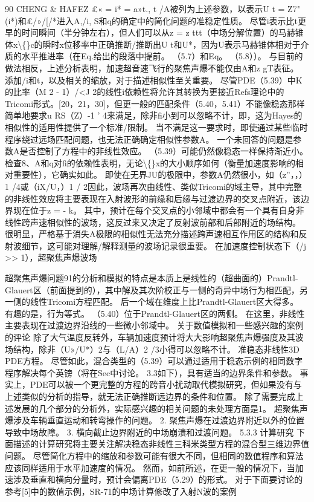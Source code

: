 \documentclass[UTF8,11pt,a4paper,openany,fontset=fandol]{ctexbook}
\begin{document}
90 CHENG \& HAFEZ £« = i* = a»t., t /A被列为上述参数，以表示U t = Z7"(i*)和£/»/[/*进入A,/i, S和q的确定中的简化问题的准稳定性质。 尽管i表示比t更早的时间瞬间（半分钟左右），但人们可以从z = z ttt（中场分解位置）的马赫锥体x\textbackslash\{\}c的瞬时x位移率中正确推断/推断出U t和U*，因为U表示马赫锥体相对于介质的水平推进率（在Eq.给出的段落中提前。 （5.7）和Eq。 （5.8））。 与目前的做法相反，上述分析表明，加速超音速飞行的聚焦声爆不能仅由A和z gT表征。 添加/i和t，以及相关的缩放，对于描述相似性至关重要。 尽管PDE（5.39）中K的比率（M 2 - 1）/<J 2的线性i依赖性将允许其转换为更接近Refs理论中的Tricomi形式。[20，21，30]，但更一般的匹配条件（5.40，5.41）不能像稳态那样简单地要求u RS（Z）-1 ' 4来满足，除非fi小到可以忽略不计，即，这为Hayes的相似性的适用性提供了一个标准/限制。 当不满足这一要求时，即使通过某些临时程序绕过远场匹配问题，也无法正确确定相似性参数A。 一个未回答的问题是参数A是否控制了方程中的非线性效应。 （5.39）可能仍然像稳态一样保持渐近小。 检查8、A和q对fi的依赖性表明，无论\textbackslash\{\}x的大小顺序如何（衡量加速度影响的相对重要性），它确实如此。 即使在无界JU的极限中，参数A仍然很小，如（z”，，）1 /4或（iX/U，）1 / 2因此，波场再次由线性、类似Tricomi的域主导，其中完整的非线性效应将主要表现在入射波形的前缘和后缘与过渡边界的交叉点附近，该边界现在位于z = - k。 其中，预计在每个交叉点的小邻域中都会有一个具有自身非线性跨声速相似性的波场，这反过来又决定了反射波前部和后部附近的场结构。 很明显，严格基于消失A极限的相似性无法充分描述跨声速相互作用区的结构和反射波细节，这可能对理解/解释测量的波场记录很重要。 在加速度控制状态下（/j >> 1），超聚焦声爆波场

超聚焦声爆问题91的分析和模拟的特点是本质上是线性的（超曲面的）Prandtl-Glauert区（前面提到的），其中解及其次阶校正与一侧的奇异中场行为相匹配，另一侧的线性Tricomi方程匹配。 后一个域在维度上比Prandtl-Glauert区大得多。 有趣的是，行为等式。 （5.40）位于Prandtl-Glauert区的两侧。 在这里，非线性主要表现在过渡边界沿线的一些微小邻域中。 关于数值模拟和一些感兴趣的案例的评论 除了大气温度反转外，车辆加速度预计将大大影响超聚焦声爆强度及其波场结构，除非（U»/U*）2与（L/A）2 /3小得可以忽略不计。 准稳态非线性3D PDE方程。 尽管如此，混合类型的（5.39）可以通过适用于稳态示例的相同数字程序解决每个英镑（将在Sec中讨论。 3.3如下），具有适当的边界条件和参数。 事实上，PDE可以被一个更完整的方程的跨音小扰动取代模拟研究，但如果没有与上述类似的分析的指导，就无法正确推断远边界的条件和位置。 除了需要完成上述发展的几个部分的分析外，实际感兴趣的相关问题的未处理方面是1。 超聚焦声爆涉及车辆垂直运动和转弯操作的问题。 2. 聚焦声爆在过渡边界附近以外的位置导致中场故障。 3. 横向截止边界附近的中场崩溃和过渡问题。 5.3.3 计算研究 下面描述的计算研究将主要关注解决稳态非线性三科米类型方程的混合型三维边界值问题。 尽管简化方程中的缩放和参数可能有很大不同，但相同的数值程序和算法应该同样适用于水平加速度的情况。 然而，如前所述，在更一般的情况下，当加速涉及垂直和横向分量时，预计会偏离PDE（5.29）的形式。 对于下面要讨论的参考[5]中的数值示例，SR-71的中场计算修改了入射N波的案例
\end{document}
